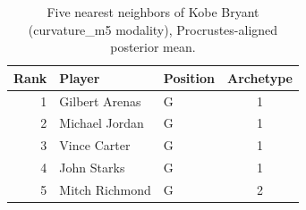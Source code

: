 \begin{table}[htbp]
  \centering\small
  \begin{tabular}{rllc}
    \toprule
    Rank & Player & Position & Archetype \\
    \midrule
    1 & Gilbert Arenas & G & 1 \\
    2 & Michael Jordan & G & 1 \\
    3 & Vince Carter & G & 1 \\
    4 & John Starks & G & 1 \\
    5 & Mitch Richmond & G & 2 \\
    \bottomrule
  \end{tabular}
  \caption{Five nearest neighbors of Kobe Bryant (curvature_m5 modality), Procrustes-aligned posterior mean.}
  \label{tab:Kobe_Bryant_neighbors_curvature_m5}
\end{table}

